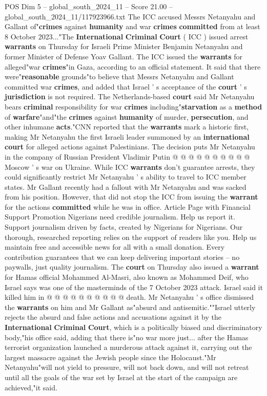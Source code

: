 \begin{textsample}{POS Dim 5 – global\_south\_2024\_11 – Score 21.00 – global\_south\_2024\_11/117923966.txt}  \label{ex:f5_pos_023}
The ICC accused Messrs Netanyahu and Gallant of"\textbf{crimes} against \textbf{humanity} and war \textbf{crimes} \textbf{committed} from at least 8 October 2023..."The \textbf{International} \textbf{Criminal} \textbf{Court} ( ICC ) issued arrest \textbf{warrants} on Thursday for Israeli Prime Minister Benjamin Netanyahu and former Minister of Defense Yoav Gallant.
The ICC issued the \textbf{warrants} for alleged"war \textbf{crimes}"in Gaza, according to an official statement.
It said that there were"\textbf{reasonable} grounds"to believe that Messrs Netanyahu and Gallant committed war \textbf{crimes}, and added that Israel ' s acceptance of the \textbf{court} ' s \textbf{jurisdiction} is not required.
The Netherlands-based \textbf{court} said Mr Netanyahu bears \textbf{criminal} responsibility for war \textbf{crimes} including"\textbf{starvation} as a \textbf{method} of \textbf{warfare}"and"the \textbf{crimes} against \textbf{humanity} of murder, \textbf{persecution}, and other inhumane \textbf{acts}."CNN reported that the \textbf{warrants} mark a historic first, making Mr Netanyahu the first Israeli leader summoned by an \textbf{international} \textbf{court} for alleged actions against Palestinians.
The decision puts Mr Netanyahu in the company of Russian President Vladimir Putin @ @ @ @ @ @ @ @ @ @ Moscow ' s war on Ukraine.
While ICC \textbf{warrants} don't guarantee arrests, they could significantly restrict Mr Netanyahu ' s ability to travel to ICC member states.
Mr Gallant recently had a fallout with Mr Netanyahu and was sacked from his position.
However, that did not stop the ICC from issuing the \textbf{warrant} for the actions \textbf{committed} while he was in office.
Article Page with Financial Support Promotion Nigerians need credible journalism.
Help us report it.
Support journalism driven by facts, created by Nigerians for Nigerians.
Our thorough, researched reporting relies on the support of readers like you.
Help us maintain free and accessible news for all with a small donation.
Every contribution guarantees that we can keep delivering important stories -- no paywalls, just quality journalism.
The \textbf{court} on Thursday also issued a \textbf{warrant} for Hamas official Mohammed Al-Masri, also known as Mohammed Deif, who Israel says was one of the masterminds of the 7 October 2023 attack.
Israel said it killed him in @ @ @ @ @ @ @ @ @ @ death.
Mr Netanyahu ' s office dismissed the \textbf{warrants} on him and Mr Gallant as"absurd and antisemitic.""Israel utterly rejects the absurd and false actions and accusations against it by the \textbf{International} \textbf{Criminal} \textbf{Court}, which is a politically biased and discriminatory body,"his office said, adding that there is"no war more just... after the Hamas terrorist organization launched a murderous attack against it, carrying out the largest massacre against the Jewish people since the Holocaust."Mr Netanyahu"will not yield to pressure, will not back down, and will not retreat until all the goals of the war set by Israel at the start of the campaign are achieved,"it said.

\end{textsample}
